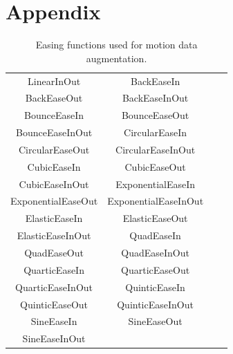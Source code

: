 \documentclass[final]{cvpr}
\begin{document}
\appendix

\section{Appendix}

\begin{table}[htb]
    \centering
    \caption{Easing functions used for motion data augmentation.}
    \label{easingFunctions}
    \begin{tabular}{cccc}
        \toprule
        LinearInOut      & BackEaseIn        \\ BackEaseOut        & BackEaseInOut        \\
        BounceEaseIn     & BounceEaseOut     \\ BounceEaseInOut    & CircularEaseIn       \\
        CircularEaseOut  & CircularEaseInOut \\ CubicEaseIn        & CubicEaseOut         \\
        CubicEaseInOut   & ExponentialEaseIn \\ ExponentialEaseOut & ExponentialEaseInOut \\
        ElasticEaseIn    & ElasticEaseOut    \\ ElasticEaseInOut   & QuadEaseIn           \\
        QuadEaseOut      & QuadEaseInOut     \\ QuarticEaseIn      & QuarticEaseOut       \\
        QuarticEaseInOut & QuinticEaseIn     \\ QuinticEaseOut     & QuinticEaseInOut     \\
        SineEaseIn       & SineEaseOut       \\ SineEaseInOut \\
        \bottomrule
    \end{tabular}
\end{table}
\end{document}
